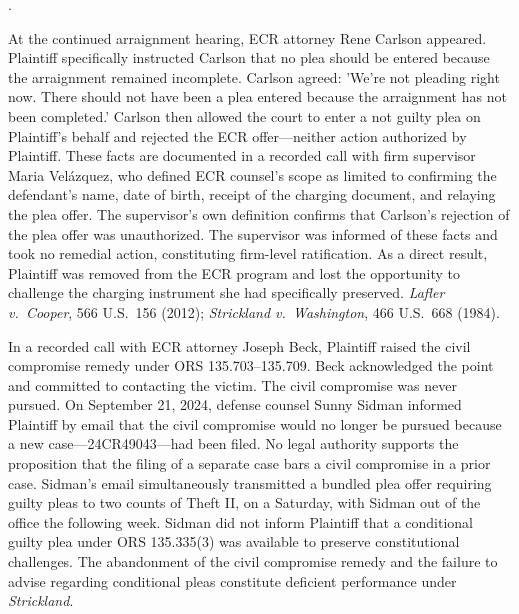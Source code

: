 \documentclass[12pt,letterpaper]{article}
\newcounter{complaintpara}
\newenvironment{paras}{%
	\begin{list}{\arabic{complaintpara}.}{%
			\setlength{\leftmargin}{0.5in}%
			\setlength{\labelwidth}{0.4in}%
			\setlength{\labelsep}{0.1in}%
			\setlength{\itemsep}{0pt}%
			\setlength{\parsep}{0pt}%
			\setlength{\topsep}{6pt}%
		}%
	}{%
	\end{list}%
}
\begin{document}
\begin{paras}
		\item\label{fact:27775-carlson} At the continued arraignment hearing, ECR attorney Rene Carlson appeared. Plaintiff specifically instructed Carlson that no plea should be entered because the arraignment remained incomplete. Carlson agreed: 'We're not pleading right now. There should not have been a plea entered because the arraignment has not been completed.' Carlson then allowed the court to enter a not guilty plea on Plaintiff's behalf and rejected the ECR offer---neither action authorized by Plaintiff. These facts are documented in a recorded call with firm supervisor Maria Vel\'azquez, who defined ECR counsel's scope as limited to confirming the defendant's name, date of birth, receipt of the charging document, and relaying the plea offer. The supervisor's own definition confirms that Carlson's rejection of the plea offer was unauthorized. The supervisor was informed of these facts and took no remedial action, constituting firm-level ratification. As a direct result, Plaintiff was removed from the ECR program and lost the opportunity to challenge the charging instrument she had specifically preserved. \textit{Lafler v.\ Cooper}, 566 U.S.\ 156 (2012); \textit{Strickland v.\ Washington}, 466 U.S.\ 668 (1984).
		\item\label{fact:27775-civil-compromise} In a recorded call with ECR attorney Joseph Beck, Plaintiff raised the civil compromise remedy under ORS 135.703--135.709. Beck acknowledged the point and committed to contacting the victim. The civil compromise was never pursued. On September 21, 2024, defense counsel Sunny Sidman informed Plaintiff by email that the civil compromise would no longer be pursued because a new case---24CR49043---had been filed. No legal authority supports the proposition that the filing of a separate case bars a civil compromise in a prior case. Sidman's email simultaneously transmitted a bundled plea offer requiring guilty pleas to two counts of Theft II, on a Saturday, with Sidman out of the office the following week. Sidman did not inform Plaintiff that a conditional guilty plea under ORS 135.335(3) was available to preserve constitutional challenges. The abandonment of the civil compromise remedy and the failure to advise regarding conditional pleas constitute deficient performance under \textit{Strickland}.

\end{paras}
\end{document}
